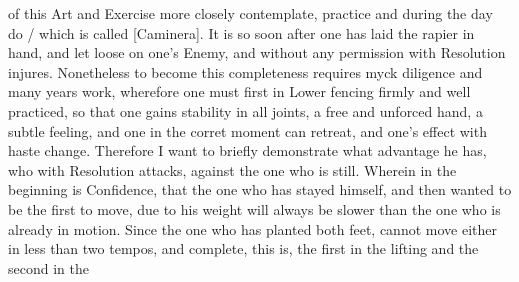 of this Art and Exercise more closely contemplate,
practice and during the day do / which is called
[Caminera]. It is so
soon after one has laid the rapier in hand, and let loose on one's
Enemy, and without any permission with Resolution injures. Nonetheless
to become this completeness requires myck diligence and many years
work, wherefore one must first in Lower fencing firmly and well
practiced, so that one gains stability in all joints, a free and
unforced hand, a subtle feeling, and one in the corret moment can
retreat, and one's effect with haste change.
Therefore I want to briefly demonstrate what advantage he has, who
with Resolution attacks, against the one who is still. Wherein in the
beginning is Confidence, that the one who has stayed himself, and then
wanted to be the first to move, due to his weight will always be
slower than the one who is already in motion. Since the one who has
planted both feet, cannot move either in less than two tempos, and
complete, this is, the first in the lifting and the second in the
